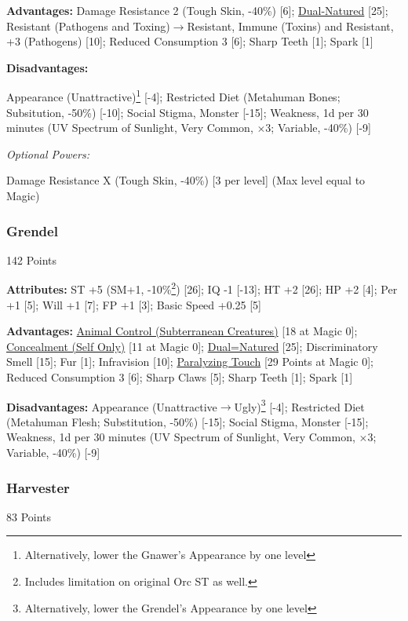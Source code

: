 \begin{multicols*}{3}
	\textbf{Advantages:}
	Damage Resistance 2 (Tough Skin, -40\%) [6]; \hyperref[dual_natured]{Dual-Natured} [25]; Resistant (Pathogens and Toxing)$\rightarrow$Resistant, Immune (Toxins)  and Resistant, +3 (Pathogens) [10]; Reduced Consumption 3 [6]; Sharp Teeth [1]; Spark [1]
	
	\textbf{Disadvantages:}
	
	Appearance (Unattractive)\footnote{Alternatively, lower the Gnawer's Appearance by one level} [-4]; Restricted Diet (Metahuman Bones; Subsitution, -50\%) [-10]; Social Stigma, Monster [-15]; Weakness, 1d per 30 minutes (UV Spectrum of Sunlight, Very Common, $\times$3; Variable, -40\%) [-9]
	
	\textit{Optional Powers:}
	
	Damage Resistance X (Tough Skin, -40\%) [3 per level] (Max level equal to Magic)
	
	\subsubsection{Grendel}\label{grendel}
	\begin{flushright}
		142 Points
	\end{flushright}
	
	\textbf{Attributes:}
	ST +5 (SM+1, -10\%\footnote{Includes limitation on original Orc ST as well.}) [26]; IQ -1 [-13]; HT +2 [26]; HP +2 [4]; Per +1 [5]; Will +1 [7]; FP +1 [3]; Basic Speed +0.25 [5]
	
	\textbf{Advantages:}
	\hyperref[animal_control]{Animal Control (Subterranean Creatures)} [18 at Magic 0]; \hyperref[concealment_self_only]{Concealment (Self Only)} [11 at Magic 0]; \hyperref[dual_natured]{Dual=Natured} [25]; Discriminatory Smell [15]; Fur [1]; Infravision [10]; \hyperref[paralyzing_touch]{Paralyzing Touch} [29 Points at Magic 0]; Reduced Consumption 3 [6]; Sharp Claws [5]; Sharp Teeth [1]; Spark [1]
	
	\textbf{Disadvantages:}
	Appearance (Unattractive$\rightarrow$Ugly)\footnote{Alternatively, lower the Grendel's Appearance by one level} [-4]; Restricted Diet (Metahuman Flesh; Substitution, -50\%) [-15]; Social Stigma, Monster [-15]; Weakness, 1d per 30 minutes (UV Spectrum of Sunlight, Very Common, $\times$3; Variable, -40\%) [-9]	
	
	\subsubsection{Harvester}\label{harvester}
	\begin{flushright}
		83 Points
	\end{flushright}
	

\end{multicols*}
